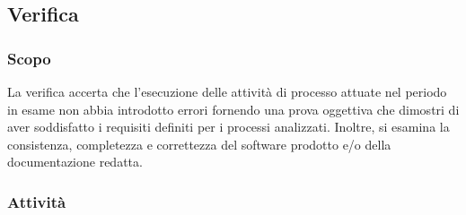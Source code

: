 \subsection{Verifica}

	\subsubsection{Scopo}
	La verifica accerta che l'esecuzione delle attività di processo attuate nel periodo in esame non abbia introdotto errori fornendo una prova oggettiva che dimostri di aver soddisfatto i requisiti definiti per i processi analizzati.
	Inoltre, si esamina la consistenza, completezza e correttezza del software prodotto e/o della documentazione redatta.
	\subsubsection{Attività}
